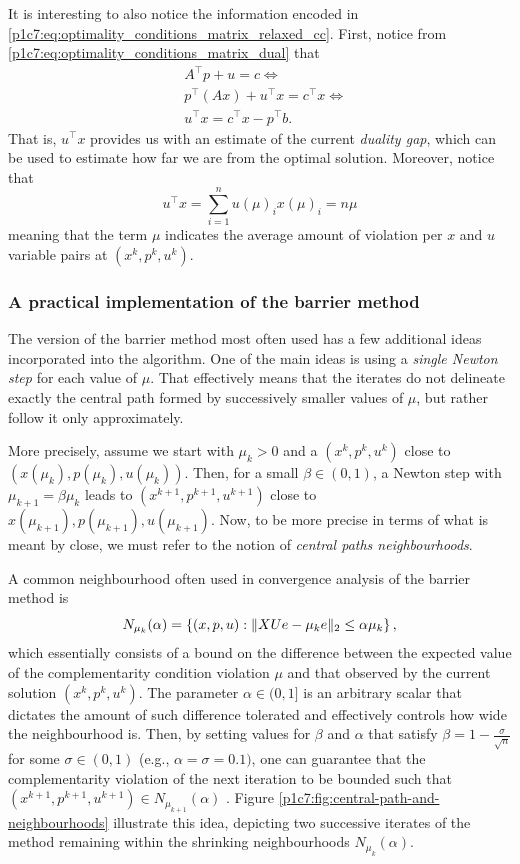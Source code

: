 It is interesting to also notice the information encoded in \eqref{p1c7:eq:optimality_conditions_matrix_relaxed_cc}. First, notice from \eqref{p1c7:eq:optimality_conditions_matrix_dual} that 
	\begin{align*}
		& A^\top p + u = c \Leftrightarrow \\	
		& p^\top (A x) + u^\top x = c^\top x  \Leftrightarrow  \\
		& u^\top x = c^\top x - p^\top b.
	\end{align*}
	That is, $u^\top x$ provides us with an estimate of the current \emph{duality gap}, which can be used to estimate how far we are from the optimal solution. Moreover, notice that
	$$
	u^\top x = \sum_{i =1}^n u(\mu)_i x(\mu)_i = n\mu 
	$$
	meaning that the term $\mu$ indicates the average amount of violation per $x$ and $u$ variable pairs at $(x^k, p^k, u^k)$. 


\subsubsection{A practical implementation of the barrier method}

The version of the barrier method most often used has a few additional ideas incorporated into the algorithm. One of the main ideas is using a \emph{single Newton step} for each value of $\mu$. That effectively means that the iterates do not delineate exactly the central path formed by successively smaller values of $\mu$, but rather follow it only approximately. 

More precisely, assume we start with $\mu_k > 0$ and a $(x^k, p^k, u^k)$ close to $(x(\mu_k), p(\mu_k), u(\mu_k))$. Then, for a small $\beta \in (0,1)$, a Newton step with $\mu_{k+1} = \beta \mu_k$ leads to $(x^{k+1}, p^{k+1}, u^{k+1})$ close to $x(\mu_{k+1}), p(\mu_{k+1}), u(\mu_{k+1})$. Now, to be more precise in terms of what is meant by close, we must refer to the notion of \emph{central paths neighbourhoods}.

A common neighbourhood often used in convergence analysis of the barrier method is
	\begin{equation*}
		N_{\mu_k}(\alpha) =  \left\{ (x, p, u) : \|X  U e - \mu_k e \|_2 \leq \alpha \mu_k \right \},
	\end{equation*} 
	which essentially consists of a bound on the difference between the expected value of the complementarity condition violation $\mu$ and that observed by the current solution $(x^k, p^k, u^k)$. The parameter $\alpha \in (0,1]$ is an arbitrary scalar that dictates the amount of such difference tolerated and effectively controls how wide the neighbourhood is. Then, by setting values for $\beta$ and $\alpha$ that satisfy $\beta = 1 - \frac{\sigma}{\sqrt{n}}$ for some $\sigma \in (0,1)$ (e.g., $\alpha = \sigma = 0.1)$, one can guarantee that the complementarity violation of the next iteration to be bounded such that $(x^{k+1}, p^{k+1}, u^{k+1}) \in N_{\mu_{k+1}}(\alpha)$ \cite{gondzio2012interior}. Figure \ref{p1c7:fig:central-path-and-neighbourhoods} illustrate this idea, depicting two successive iterates of the method remaining within the shrinking neighbourhoods $N_{\mu_k}(\alpha)$. 
	
